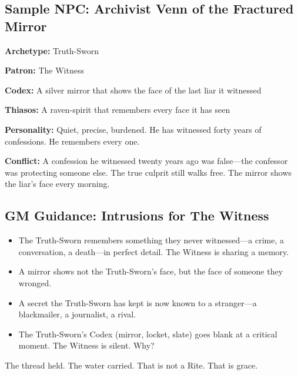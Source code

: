 \subsection{Sample NPC: Archivist Venn of the Fractured Mirror}

\textbf{Archetype:} Truth-Sworn

\textbf{Patron:} The Witness

\textbf{Codex:} A silver mirror that shows the face of the last liar it witnessed

\textbf{Thiasos:} A raven-spirit that remembers every face it has seen

\textbf{Personality:} Quiet, precise, burdened. He has witnessed forty years of confessions. He remembers every one.

\textbf{Conflict:} A confession he witnessed twenty years ago was false—the confessor was protecting someone else. The true culprit still walks free. The mirror shows the liar's face every morning.

\subsection{GM Guidance: Intrusions for The Witness}

\begin{itemize}
\item The Truth-Sworn remembers something they never witnessed—a crime, a conversation, a death—in perfect detail. The Witness is sharing a memory.
\item A mirror shows not the Truth-Sworn's face, but the face of someone they wronged.
\item A secret the Truth-Sworn has kept is now known to a stranger—a blackmailer, a journalist, a rival.
\item The Truth-Sworn's Codex (mirror, locket, slate) goes blank at a critical moment. The Witness is silent. Why?
\end{itemize}

The thread held. The water carried. That is not a Rite. That is grace.
